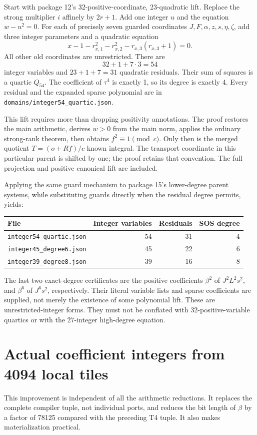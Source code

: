 \documentclass[11 pt]{article}
\begin{document}
Start with package 12's 32-positive-coordinate, 23-quadratic lift. Replace the strong multiplier $ i $ affinely by $ 2 r+1 $. Add one integer $ u $ and the equation $ w-u^2=0 $. For each of precisely seven guarded coordinates $ J,F,\alpha,z,s,\eta,\zeta $, add three integer parameters and a quadratic equation
\[
x-1-r_{x, 1}^2-r_{x, 2}^2-r_{x, 3}(r_{x, 3}+1)=0.
\]
All other old coordinates are unrestricted. There are
\[
32+1+7\cdot 3=54
\]
integer variables and $ 23+1+7=31 $ quadratic residuals. Their sum of squares is a quartic $ Q_{54}$. The coefficient of $\tau^4 $ is exactly 1, so its degree is exactly 4. Every residual and the expanded sparse polynomial are in \texttt{domains/integer54\_quartic.json}.

This lift requires more than dropping positivity annotations. The proof restores the main arithmetic, derives $ w>0 $ from the main norm, applies the ordinary strong-rank theorem, then obtains $ f^2\equiv 1\pmod c $. Only then is the merged quotient $ T=(o+Rf)/c $ known integral. The transport coordinate in this particular parent is shifted by one; the proof retains that convention. The full projection and positive canonical lift are included.

Applying the same guard mechanism to package 15's lower-degree parent systems, while substituting guards directly when the residual degree permits, yields:
\begin{center}\small
\begin{tabular}{lrrr}
\toprule
File&Integer variables&Residuals&SOS degree\\
\midrule
\texttt{integer54\_quartic.json}&54&31&4\\
\texttt{integer45\_degree6.json}&45&22&6\\
\texttt{integer39\_degree8.json}&39&16&8\\
\bottomrule
\end{tabular}
\end{center}
The last two exact-degree certificates are the positive coefficients
$\beta^2 $ of $ J^2 L^2 s^2 $, and $\beta^6 $ of $ J^6 s^2 $, respectively. Their literal variable lists and sparse coefficients are supplied, not merely the existence of some polynomial lift. These are unrestricted-integer forms. They must not be conflated with 32-positive-variable quartics or with the 27-integer high-degree equation.

\section{Actual coefficient integers from 4094 local tiles}
This improvement is independent of all the arithmetic reductions. It replaces the complete compiler tuple, not individual ports, and reduces the bit length of $\beta $ by a factor of 78125 compared with the preceding T4 tuple. It also makes materialization practical.
\end{document}
